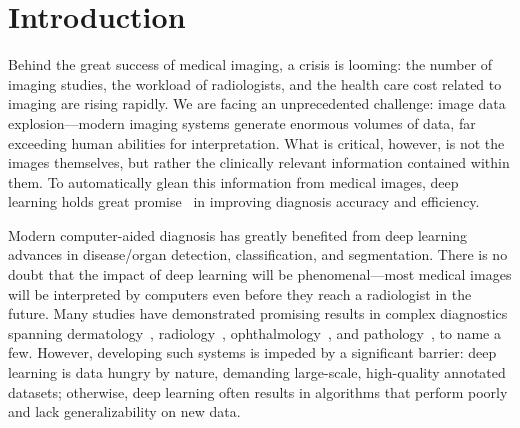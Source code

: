 \chapter{Introduction}
\label{ch1}

Behind the great success of medical imaging, a crisis is looming: the number of imaging studies, the workload of radiologists, and the health care cost related to imaging are rising rapidly. 
We are facing an unprecedented challenge: image data explosion---modern imaging systems generate enormous volumes of data, far exceeding human abilities for interpretation. 
What is critical, however, is not the images themselves, but rather the clinically relevant information contained within them. To automatically glean this information from medical images, deep learning holds great promise~\citep{goodfellow2016deep} in improving diagnosis accuracy and efficiency. 

Modern computer-aided diagnosis has greatly benefited from deep learning advances in disease/organ detection, classification, and segmentation. There is no doubt that the impact of deep learning will be phenomenal---most medical images will be interpreted by computers even before they reach a radiologist in the future. Many studies have demonstrated promising results in complex diagnostics spanning dermatology~\citep{esteva2017dermatologist,haenssle2018man}, radiology~\citep{cheng2016computer,cicero2017training,kooi2017large,ardila2019end}, ophthalmology~\citep{gulshan2016development,poplin2018prediction,de2018clinically}, and pathology~\citep{beck2011systematic,cirecsan2013mitosis,charoentong2017pan,yamamoto2019automated}, to name a few. However, developing such systems is impeded by a significant barrier: deep learning is data hungry by nature, demanding large-scale, high-quality annotated datasets; otherwise, deep learning often results in algorithms that perform poorly and lack generalizability on new data.


